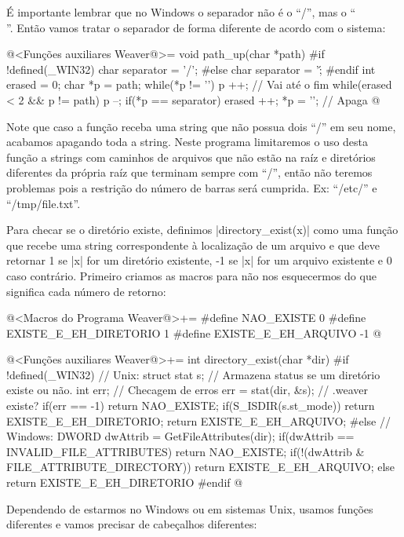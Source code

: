 É importante lembrar que no Windows o separador não é o ``/'', mas o
``\\''. Então vamos tratar o separador de forma diferente de acordo
com o sistema:

\iniciocodigo
@<Funções auxiliares Weaver@>=
void path_up(char *path){
#if !defined(_WIN32)
  char separator = '/';
#else
  char separator = '\';
#endif
  int erased = 0;
  char *p = path;
  while(*p != '\0') p ++; // Vai até o fim
  while(erased < 2 && p != path){
    p --;
    if(*p == separator) erased ++;
    *p = '\0'; // Apaga
  }
}
@
\fimcodigo

Note que caso a função receba uma string que não possua dois ``/'' em
seu nome, acabamos apagando toda a string. Neste programa limitaremos
o uso desta função a strings com caminhos de arquivos que não estão na
raíz e diretórios diferentes da própria raíz que terminam sempre com
``/'', então não teremos problemas pois a restrição do número de
barras será cumprida. Ex: ``/etc/'' e ``/tmp/file.txt''.


Para checar se o diretório  existe, definimos
|directory_exist(x)| como uma função que recebe uma string
correspondente à localização de um arquivo e que deve retornar 1 se
|x| for um diretório existente, -1 se |x| for um arquivo existente e 0
caso contrário. Primeiro criamos as macros para não nos esquecermos do
que significa cada número de retorno:

\iniciocodigo
@<Macros do Programa Weaver@>+=
#define NAO_EXISTE             0
#define EXISTE_E_EH_DIRETORIO  1
#define EXISTE_E_EH_ARQUIVO   -1
@
\fimcodigo

\iniciocodigo
@<Funções auxiliares Weaver@>+=
int directory_exist(char *dir){
#if !defined(_WIN32)
  // Unix:
  struct stat s; // Armazena status se um diretório existe ou não.
  int err; // Checagem de erros
  err = stat(dir, &s); // .weaver existe?
  if(err == -1) return NAO_EXISTE;
  if(S_ISDIR(s.st_mode)) return EXISTE_E_EH_DIRETORIO;
  return EXISTE_E_EH_ARQUIVO;
#else
  // Windows:
  DWORD dwAttrib = GetFileAttributes(dir);
  if(dwAttrib == INVALID_FILE_ATTRIBUTES) return NAO_EXISTE;
  if(!(dwAttrib & FILE_ATTRIBUTE_DIRECTORY)) return EXISTE_E_EH_ARQUIVO;
  else return EXISTE_E_EH_DIRETORIO
#endif
}
@
\fimcodigo

Dependendo de estarmos no Windows ou em sistemas Unix, usamos funções
diferentes e vamos precisar de cabeçalhos diferentes:

